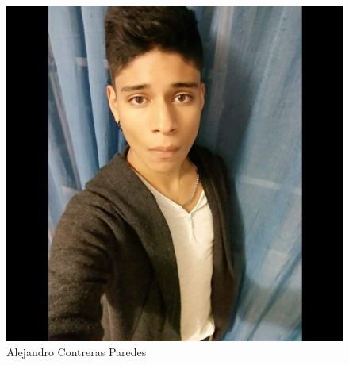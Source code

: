 \documentclass[12pt,twoside]{article}
\begin{document}
\begin{figure}[!h]
	\centering
	\begin{minipage}[t]{10cm}
		\centering
		\includegraphics[scale=0.2]{Foto1}
		\caption{Alejandro Contreras Paredes}
	\end{minipage}
	\hspace{18cm}
	\begin{minipage}[t]{10cm}
		\centering

\end{minipage}
\end{figure}
\end{document}
